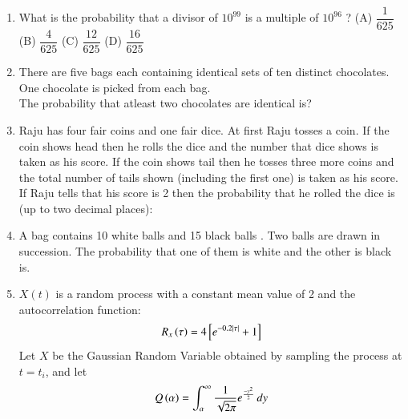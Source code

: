 \documentclass[journal,12pt,twocolumn]{IEEEtran}
\begin{document}
\begin{enumerate}
(A) 0\\
(B) $\frac{1}{6}$\\
(C) $\frac{1}{3}$\\
(D) $\frac{1}{12}$
\\
\solution

%
\item What is the probability that a divisor of $10^{99}$ is a multiple of $10^{96}$ ?
\vspace{0.5 cm}
(A) $\dfrac{1}{625}$ \hspace{0.5 cm} (B) $\dfrac{4}{625}$ \hspace{0.5 cm} (C) $\dfrac{12}{625}$ \hspace{0.5 cm} (D) $\dfrac{16}{625}$
%
\\
\solution

%
\item There are five bags each containing identical sets of ten distinct chocolates. One chocolate is picked from each bag.\\
The probability that atleast two chocolates are identical is?\\
\solution

%
\item Raju has four fair coins and one fair dice. At first Raju tosses a coin. If the coin shows head then he rolls the dice and the number that dice shows is taken as his score. If the coin shows tail then he tosses three more coins and the total number of tails shown (including the first one) is taken as his score. If Raju tells that his score is 2 then the probability that he rolled the dice is (up to two decimal places):
%
\\
\solution

%
\item A bag contains 10 white balls and 15 black balls . Two balls are drawn in succession. The probability that one of them is white and the other is black is.
\\
\solution

%
\item $X(t)$ is a random process with a constant mean value of 2 and the autocorrelation function:
\begin{align}
    R_x\brak{\tau} = 4\sbrak{e^{-0.2|\tau|} + 1}
    \label{autocorrelation}
\end{align}
Let $X$ be the Gaussian Random Variable obtained by sampling the process at $t = t_i$, and let 
\begin{align}
    Q\brak{\alpha} = \int_{\alpha}^{\infty} \frac{1}{\sqrt{2\pi}} e^{\frac{-y^2}{2}}\,dy
    \label{Q}

\end{align}
\end{enumerate}
\end{document}
